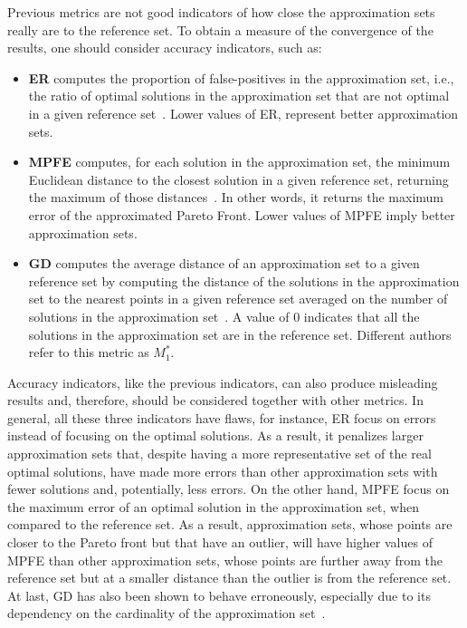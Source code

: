 Previous metrics are not good indicators of how close the approximation sets really are to the reference set. To obtain a measure of the convergence of the results, one should consider accuracy indicators, such as:
\begin{itemize}
\item \textbf{\ac{ER}} computes the proportion of false-positives in the approximation set, i.e., the ratio of optimal solutions in the approximation set that are not optimal in a given reference set~\cite{Veldhuizen1999GD}. Lower values of \ac{ER}, represent better approximation sets. 
\item \textbf{\ac{MPFE}} computes, for each solution in the approximation set, the minimum Euclidean distance to the closest solution in a given reference set, returning the maximum of those distances~\cite{Veldhuizen1999GD}. In other words, it returns the maximum error of the approximated Pareto Front. Lower values of \ac{MPFE} imply better approximation sets. 
\item \textbf{\ac{GD}} computes the average distance of an approximation set to a given reference set by computing the distance of the solutions in the approximation set to the nearest points in a given reference set averaged on the number of solutions in the approximation set~\cite{Veldhuizen1999GD}. A value of $0$ indicates that all the solutions in the approximation set are in the reference set. Different authors\cite{Zitzler2000m1m3} refer to this metric as \textbf{$M_1^\ast$}.
\end{itemize}

Accuracy indicators, like the previous indicators, can also produce misleading results and, therefore, should be considered together with other metrics. In general, all these three indicators have flaws, for instance, \ac{ER} focus on errors instead of focusing on the optimal solutions. As a result, it penalizes larger approximation sets that, despite having a more representative set of the real optimal solutions, have made more errors than other approximation sets with fewer solutions and, potentially, less errors. On the other hand, \ac{MPFE} focus on the maximum error of an optimal solution in the approximation set, when compared to the reference set. As a result, approximation sets, whose points are closer to the Pareto front but that have an outlier, will have higher values of \ac{MPFE} than other approximation sets, whose points are further away from the reference set but at a smaller distance than the outlier is from the reference set. At last, \ac{GD} has also been shown to behave erroneously, especially due to its dependency on the cardinality of the approximation set~\cite{Ishibuchi2005GDIGD}.

